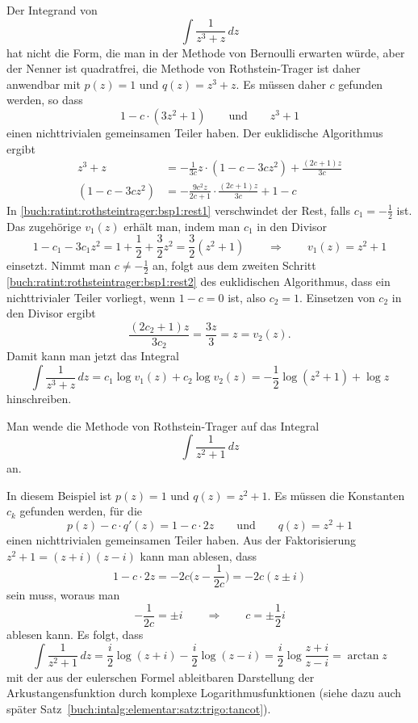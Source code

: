 \begin{beispiel}
Der Integrand von
\[
\int \frac{1}{z^3+z}
\,dz
\]
hat nicht die Form, die man in der Methode von Bernoulli erwarten
würde, aber der Nenner ist quadratfrei, die Methode von Rothstein-Trager
ist daher anwendbar mit $p(z)=1$ und $q(z) = z^3+z$.
Es müssen daher $c$ gefunden werden, so dass 
\[
1-c\cdot (3z^2+1)
\qquad\text{und}\qquad
z^3+1
\]
einen nichttrivialen gemeinsamen Teiler haben.
Der euklidische Algorithmus ergibt
\begin{align}
z^3+z
&=
-\frac{1}{3c}z
\cdot
(1-c - 3cz^2)
+
\frac{(2c+1)z}{3c}
\label{buch:ratint:rothsteintrager:bsp1:rest1}
\\
(1-c - 3cz^2)
&=
-\frac{9c^2z}{2c+1}
\cdot
\frac{(2c+1)z}{3c}
+
1-c
\label{buch:ratint:rothsteintrager:bsp1:rest2}
\end{align}
In \eqref{buch:ratint:rothsteintrager:bsp1:rest1} verschwindet
der Rest, falls $c_1=-\frac12$ ist.
Das zugehörige $v_1(z)$ erhält man, indem man $c_1$ in den Divisor
\[
1-c_1-3c_1z^2
=
1+\frac12+\frac32z^2
=
\frac32(z^2+1)
\qquad\Rightarrow\qquad
v_1(z)
=
z^2+1
\]
einsetzt.
Nimmt man $c\ne -\frac12$ an, folgt aus dem zweiten
Schritt
\eqref{buch:ratint:rothsteintrager:bsp1:rest2}
des euklidischen Algorithmus, dass ein nichttrivialer Teiler vorliegt,
wenn $1-c=0$ ist, also $c_2=1$.
Einsetzen von $c_2$ in den Divisor ergibt
\[
\frac{(2c_2+1)z}{3c_2}
=
\frac{3z}{3}
=
z
=
v_2(z).
\]
Damit kann man jetzt das Integral
\[
\int \frac{1}{z^3+z}\,dz
=
c_1\log v_1(z)
+
c_2\log v_2(z)
=
-\frac12\log(z^2+1)
+
\log z
\]
hinschreiben.
\end{beispiel}

\begin{beispiel}
Man wende die Methode von Rothstein-Trager auf das Integral
\[
\int \frac{1}{z^2+1}\,dz
\]
an.

\smallskip

\noindent
In diesem Beispiel ist $p(z) = 1$ und $q(z)=z^2+1$.
Es müssen die Konstanten $c_k$ gefunden werden, für die
\[
p(z)-c\cdot q'(z)
=
1-c\cdot 2z
\qquad\text{und}\qquad
q(z) = z^2 +1
\]
einen nichttrivialen gemeinsamen Teiler haben.
Aus der Faktorisierung $z^2+1=(z+i)(z-i)$ kann man ablesen, dass
\[
1-c\cdot 2z
=
-2c\biggl(z-\frac{1}{2c}\biggr)
=
-2c(z\pm i)
\]
sein muss, woraus man
\[
-\frac{1}{2c}=\pm i
\qquad\Rightarrow\qquad
c
=
\pm\frac12i
\]
ablesen kann.
Es folgt, dass
\[
\int \frac{1}{z^2+1}\,dz
=
\frac{i}{2}\log (z+i)
-
\frac{i}{2}\log (z-i)
=
\frac{i}2
\log
\frac{z+i}{z-i}
=
\arctan z
\]
mit der aus der eulerschen Formel ableitbaren Darstellung der
Arkustangensfunktion durch komplexe Logarithmusfunktionen
(siehe dazu auch später Satz~\ref{buch:intalg:elementar:satz:trigo:tancot}).
\end{beispiel}

